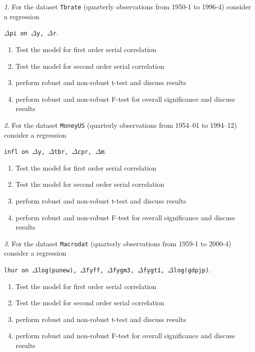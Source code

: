 \documentclass[12pt]{article}
\theoremstyle{remark}
\newtheorem{problem}{}[section]
\begin{document}
\begin{problem}
For the dataset \texttt{Tbrate} (quarterly observations from 1950-1 to 1996-4) consider a regression
\begin{center}
	\texttt{$\Delta$pi on $\Delta$y, $\Delta$r}.
\end{center}
\begin{enumerate}
	\item Test the model for first order serial correlation
	\item Test the model for second order serial correlation
	\item perform robust and non-robust t-test and discuss results
	\item perform robust and non-robust F-test for overall significance and discuss results
\end{enumerate}
\end{problem}

\begin{problem}
For the dataset \texttt{MoneyUS} (quarterly observations from 1954–01 to 1994–12) consider a regression
\begin{center}
	\texttt{infl on $\Delta$y, $\Delta$tbr, $\Delta$cpr, $\Delta$m}.
\end{center}
\begin{enumerate}
	\item Test the model for first order serial correlation
	\item Test the model for second order serial correlation
	\item perform robust and non-robust t-test and discuss results
	\item perform robust and non-robust F-test for overall significance and discuss results
\end{enumerate}
\end{problem}

\begin{problem}
For the dataset \texttt{Macrodat} (quarterly observations from 1959-1 to 2000-4) consider a regression
\begin{center}
	\texttt{lhur on $\Delta$log(punew), $\Delta$fyff, $\Delta$fygm3, $\Delta$fygt1, $\Delta$log(gdpjp)}.
\end{center}
\begin{enumerate}
	\item Test the model for first order serial correlation
	\item Test the model for second order serial correlation
	\item perform robust and non-robust t-test and discuss results
	\item perform robust and non-robust F-test for overall significance and discuss results
\end{enumerate}
\end{problem}


\end{document}
